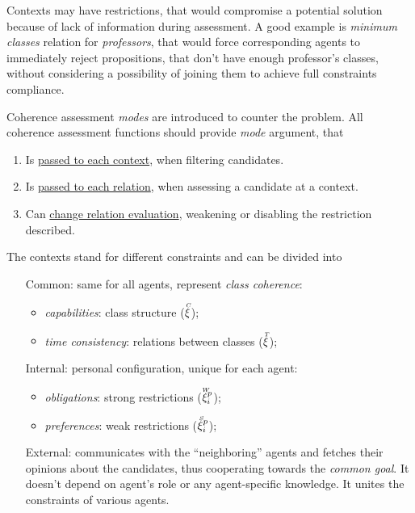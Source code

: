 \documentclass[../ThesisDoc]{subfiles}
\begin{document}

\medskip
\noindent
Contexts may have restrictions, that would compromise a potential solution
because of lack of information during assessment. A good example is
\emph{minimum classes} relation for \emph{professors}, that would force
corresponding agents to immediately reject propositions, that don't have enough
professor's classes, without considering a possibility of joining them to achieve
full constraints compliance.

Coherence assessment \emph{modes} are introduced to counter the problem.
All coherence assessment functions should provide \emph{mode} argument, that
\begin{enumerate}
  \item Is \underline{passed to each context}, when filtering candidates.
  \item Is \underline{passed to each relation}, when assessing a candidate at a context.
  \item Can \underline{change relation evaluation}, weakening or disabling the
        restriction described.
\end{enumerate}

\noindent
The contexts stand for different constraints and can be divided into
\begin{itemize}[leftmargin=2cm]
  \item[Common:] same for all agents, represent \emph{class coherence}:
    \begin{itemize}
      \item \emph{capabilities}: class structure ($\accentset{C}{\xi}$);
      \item \emph{time consistency}: relations between classes ($\accentset{T}{\xi}$);
    \end{itemize}
  \item[Internal:] personal configuration, unique for each agent:
    \begin{itemize}
      \item \emph{obligations}: strong restrictions ($\accentset{W}{\xi}^p_i$);
      \item \emph{preferences}: weak restrictions ($\accentset{S}{\xi}^p_i$);
    \end{itemize}
  \item[External:] communicates with the ``neighboring'' agents and fetches
    their opinions about the candidates, thus cooperating towards the
    \emph{common goal}. It doesn't depend on agent's role or
      any agent-specific knowledge. It unites the constraints of various agents.
\end{itemize}
\end{document}
